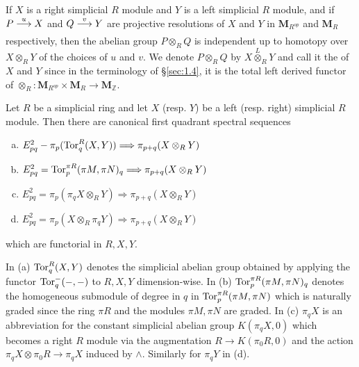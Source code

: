 \documentclass[../main]{subfiles}
\begin{document}
If $X$ is a right simplicial $R$ module and $Y$ is a left simplicial $R$ module, and if $P\varrightarrow{u}X$ and $Q\varrightarrow{v}Y$ are projective resolutions of $X$ and $Y$ in $\mathbf{M}_{R^{op}}$ and $\mathbf{M}_R$ respectively, then the abelian group $P\otimes_RQ$ is independent up to homotopy over $X\otimes_{R}Y$ of the choices of $u$ and $v$. We denote $P\otimes_RQ$ by $X\overset{L}{\otimes}_RY$ and call it the  of $X$ and $Y$ since in the terminology of \S\ref{sec:1.4}, it is the total left derived functor of $\otimes_R:\mathbf{M}_{R^{op}}\times\mathbf{M}_R\longrightarrow\mathbf{M}_{\mathbb{Z}}$.

\begin{theorem}
\label{thm:2.6}
Let $R$ be a simplicial ring and let $X$ (resp. $Y$) be a left (resp. right) simplicial $R$ module. Then there are canonical first quadrant spectral sequences 
\begin{enumerate}[(a)]
    \item\label{2.6.a} $E^2_{pq}-\pi_p(\operatorname{Tor}^R_q(X,Y))\Longrightarrow\pi_{p+q}(X\otimes_R Y)$
    \item\label{2.6.b} $E^2_{pq}=\operatorname{Tor}^{\pi R}_p(\pi M,\pi N)_q\Longrightarrow\pi_{p+q}(X\otimes_R Y)$
    \item\label{2.6.c} $E^2_{pq}=\pi_p(\pi_qX\otimes_RY)\Longrightarrow\pi_{p+q}(X\otimes_R Y)$
    \item\label{2.6.d} $E^2_{pq}=\pi_p(X\otimes_R\pi_qY)\Longrightarrow\pi_{p+q}(X\otimes_R Y)$
\end{enumerate}
which are functorial in $R,X,Y$.
\end{theorem}

In (a) $\operatorname{Tor}^R_q(X,Y)$ denotes the simplicial abelian group obtained by applying the functor $\operatorname{Tor}_q^{-}(-,-)$ to $R,X,Y$ dimension-wise. In (b) $\operatorname{Tor}^{\pi R}_p(\pi M,\pi N)_q$ denotes the homogeneous submodule of degree in $q$ in $\operatorname{Tor}^{\pi R}_p(\pi M,\pi N)$ which is naturally graded since the ring $\pi R$ and the modules $\pi M,\pi N$ are graded. In (c) $\pi_qX$ is an abbreviation for the constant simplicial abelian group $K(\pi_qX,0)$ which becomes a right $R$ module via the augmentation $R\longrightarrow K(\pi_0 R,0)$ and the action $\pi_qX\otimes\pi_0 R\longrightarrow\pi_qX$ induced by $\wedge $. Similarly for $\pi_qY$ in (d).
\end{document}
